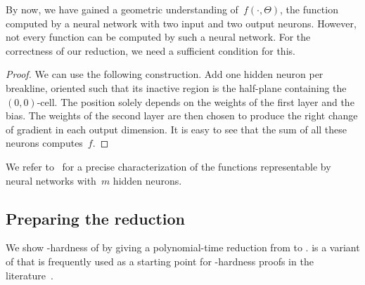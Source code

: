 By now, we
have  %
gained a geometric understanding of~$f(\cdot, \Theta)$, the \CPWL function
computed by a \ReLU neural network with two input and two output neurons.
However, not every \CPWL function can be computed by such a neural network.
For the correctness of our reduction, we need a sufficient condition for
this. %


\begin{proof}
    We can use the following construction. %
%
%
    Add one hidden neuron per breakline, oriented such that its inactive region is the half-plane containing the $(0,0)$-cell.
    The position solely depends on the weights of the first layer and the bias.
    The weights of the second layer are then chosen to produce the right change of gradient in each output dimension.
    It is easy to see that the sum of all these neurons computes~$f$.
\end{proof}

We refer to~\cite{Dereich2022_Minimal} for a precise characterization of the functions representable by \twolayer neural networks with~$m$ hidden neurons.

\subsection{Preparing the reduction}
\label{sec:reduction_overview}

We show \ER-hardness of \trainNN by giving a polynomial-time reduction from \ETRINV to \trainNN.
\ETRINV is a variant of \ETR that is frequently used as a starting point for \ER-hardness proofs in the literature~\cite{Abrahamsen2022_ArtGallery, Abrahamsen2021_NeuralNetworks, Dobbins2023_AreaUniversality, Lubiw2022_DrawingInPolygonialRegion}.

